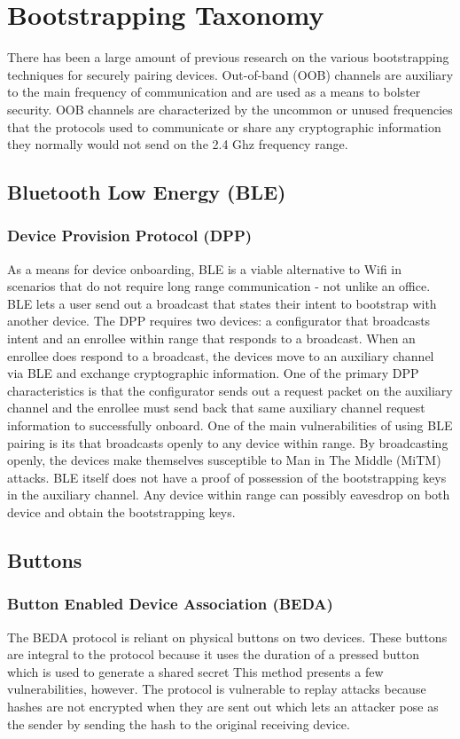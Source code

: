 \section{Bootstrapping Taxonomy}

There has been a large amount of previous research on the various bootstrapping techniques for securely pairing devices. Out-of-band (OOB) channels are auxiliary to the main frequency of communication and are used as a means to bolster security. OOB channels are characterized by the uncommon or unused frequencies that the protocols used to communicate or share any cryptographic information they normally would not send on the 2.4 Ghz frequency range.

\subsection{Bluetooth Low Energy (BLE)}
\subsubsection{Device Provision Protocol (DPP)}
As a means for device onboarding, BLE is a viable alternative to Wifi in scenarios that do not require long range communication - not unlike an office. BLE lets a user send out a broadcast that states their intent to bootstrap with another device. The DPP requires two devices: a configurator that broadcasts intent and an enrollee within range that responds to a broadcast. When an enrollee does respond to a broadcast, the devices move to an auxiliary channel via BLE and exchange cryptographic information. One of the primary DPP characteristics is that the configurator sends out a request packet on the auxiliary channel and the enrollee must send back that same auxiliary channel request information to successfully onboard. One of the main vulnerabilities of using BLE pairing is its that broadcasts openly to any device within range. By broadcasting openly, the devices make themselves susceptible to Man in The Middle (MiTM) attacks. BLE itself does not have a proof of possession of the bootstrapping keys in the auxiliary channel. Any device within range can possibly eavesdrop on both device and obtain the bootstrapping keys.


\subsection{Buttons}
\subsubsection{Button Enabled Device Association (BEDA)}
The BEDA protocol is reliant on physical buttons on two devices. These buttons are integral to the protocol because it uses the duration of a pressed button which is used to generate a shared secret This method presents a few vulnerabilities, however. The protocol is vulnerable to replay attacks because hashes are not encrypted when they are sent out which lets an attacker pose as the sender by sending the hash to the original receiving device.


